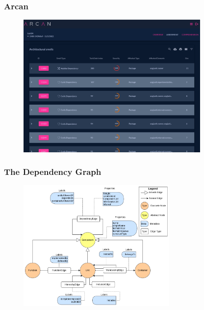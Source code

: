 \documentclass[dvipsnames, 10pt]{beamer}
\begin{document}
\begin{frame}
  \frametitle{Arcan}
  \begin{figure}
    \begin{center}
      \includegraphics[width=0.85\textwidth]{figures/architectural-smells/arcan-list.png}
    \end{center}
  \end{figure}
\end{frame}

\begin{frame}
  \frametitle{The Dependency Graph}
  \begin{figure}
    \begin{center}
      \includegraphics[width=0.7\textwidth]{figures/architectural-smells/arcan-dep-graph.png}
    \end{center}
  \end{figure}
\end{frame}
\end{document}
